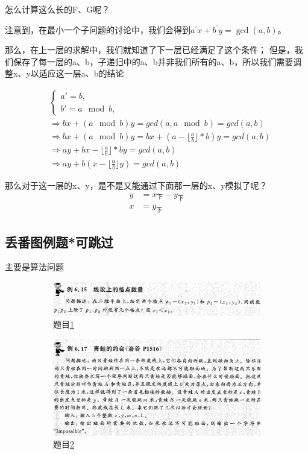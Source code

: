 \documentclass[12pt]{article}
\begin{document}
怎么计算这么长的F、G呢？

注意到，在最小一个子问题的讨论中，我们会得到$a^{'}x+b^{'}y=\gcd(a,b)$。

那么，在上一层的求解中，我们就知道了下一层已经满足了这个条件；
但是，我们保存了每一层的a、b，子递归中的a、b并非我们所有的a、b，所以我们需要调整x、y以适应这一层a、b的结论

\begin{align*}
    &\begin{cases}
        a' = b,\\
        b' = a \mod b,
    \end{cases}\\
    &\Rightarrow bx+(a\mod b)y=gcd(a,a\mod b)=gcd(a,b)\\
    &\Rightarrow bx+(a\mod b)y=bx+(a-\lfloor\frac{a}{b}\rfloor*b)y=gcd(a,b)\\
    &\Rightarrow ay+bx-\lfloor\frac{a}{b}\rfloor*b y=gcd(a,b)\\
    &\Rightarrow ay+b(x-\lfloor\frac{a}{b}\rfloor y)=gcd(a,b)
\end{align*}

那么对于这一层的x、y，是不是又能通过下面那一层的x、y模拟了呢？
\begin{align*}
    y&=x_{\text{下}}-y_{\text{下}}\\
    x&=y_{\text{下}}
\end{align*}



\subsection{丢番图例题*可跳过}

主要是算法问题
\begin{figure}[htb!]
    \centering
    \begin{subfigure}{1\textwidth}
        \includegraphics[width=\textwidth]{./images/6.15}
        \caption{题目\ref{fig.exa_1}}
        \label{fig.exa_1}
    \end{subfigure}
    \begin{subfigure}{1\textwidth}
        \includegraphics[width=\textwidth]{./images/6.17}
        \caption{题目\ref{fig.exa_2}}
        \label{fig.exa_2}
    \end{subfigure}
    \caption{}
    \label{fig.exa}
\end{figure}
\end{document}

